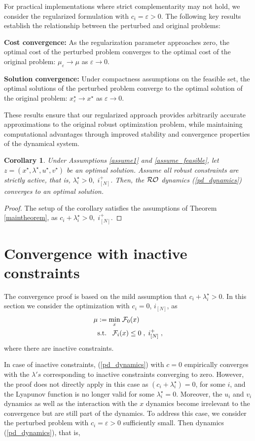 \documentclass[journal,twoside,web]{ieeecolor}
\newtheorem{corollary}{Corollary}
\begin{document}
{For practical implementations where strict complementarity may not hold, we consider the regularized formulation with $c_i = \varepsilon > 0$. The following key results establish the relationship between the perturbed and original problems:

\textbf{Cost convergence:} As the regularization parameter approaches zero, the optimal cost of the perturbed problem converges to the optimal cost of the original problem: $\mu_\varepsilon \to \mu$ as $\varepsilon \to 0$.

\textbf{Solution convergence:} Under compactness assumptions on the feasible set, the optimal solutions of the perturbed problem converge to the optimal solution of the original problem: $x^\star_\varepsilon \to x^\star$ as $\varepsilon \to 0$.

These results ensure that our regularized approach provides arbitrarily accurate approximations to the original robust optimization problem, while maintaining computational advantages through improved stability and convergence properties of the dynamical system.}

\begin{corollary}
Under Assumptions \ref{assume1} and \ref{assume_feasible}, let $z=(x^\star,\lambda^\star,u^\star,v^\star)$ be an optimal solution.
Assume all robust constraints are strictly active, that is, $\lambda_i^\star>0,\;i^+_{[N]}$. Then, the ${\cal RO}$ dynamics (\ref{pd_dynamics}) converges to an optimal solution.
\end{corollary}
\begin{proof}
The setup of the corollary satisfies the assumptions of Theorem \ref{maintheorem}, as $c_i+\lambda_i^\star>0,\;i^+_{[N]}$.
\end{proof}


\section{Convergence with inactive constraints} \label{perturbed_section_pddynamics}
The convergence proof is based on the mild assumption that $c_i+\lambda_i^\star>0$.
In this section we consider the optimization with $c_i=0$, $i_{[N]}$, as
\begin{align} \label{mu_0}
&\mu:=\underset{x}{\min} \; {\cal F}_0(x)\\
&\;\;\text{s.t.}\;\;\;{\cal F}_i(x)\leq 0\;,\;i^+_{[N]}\;,\nonumber
\end{align}
where there are inactive constraints.


In case of inactive constraints, (\ref{pd_dynamics}) with $c=0$ empirically converges with the $\lambda's$ corresponding to inactive constraints converging to zero. However, the proof does not directly apply in this case as $(c_i+\lambda_i^\star)=0$, for some $i$, and the Lyapunov function is no longer valid for some $\lambda_i^\star=0$. Moreover, the $u_i$ and $v_i$ dynamics as well as the interaction with the $x$ dynamics become irrelevant to the convergence but are still part of the dynamics.
To address this case, we consider the perturbed problem with $c_i=\varepsilon>0$ sufficiently small. Then dynamics (\ref{pd_dynamics}), that is,
\end{document}
